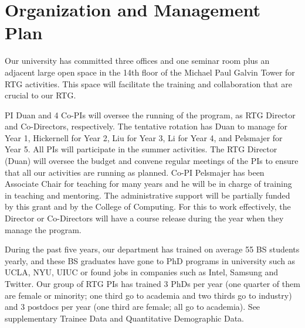 \documentclass[11pt]{NSFamsart}
\begin{document}
\section{Organization and Management Plan }
 
 \iffalse
 Provide evidence of past success in training undergraduates, graduate students, and postdocs, identifying names, degree dates, and subsequent placement (including the flow of undergraduates into graduate programs). Applicants may refer to Trainee Data in supplemental documents, if included. Describe the plans, procedures, and personnel for the development and monitoring of all aspects of the project. In particular, discuss plans to ensure appropriate mentoring of students and postdoctoral associates, as well as the roles of the faculty involved. Provide evidence of faculty commitment necessary for the implementation of the proposed program. If the project involves international collaborations, industrial internships, or arrangements with government laboratories, businesses, or other departments, then the proposal should document existing arrangements, any plans for expanding these arrangements, and the personnel involved in managing these linkages.  
 \fi
 
Our university has committed three offices and one seminar room plus an adjacent large open space in the 14th floor of the Michael Paul Galvin Tower for RTG activities. This space will facilitate the training and collaboration that are crucial to our RTG.
 
PI Duan and 4 Co-PIs will oversee the running of the program, as RTG Director  and Co-Directors, respectively.  The tentative rotation has Duan to manage for Year 1, Hickernell for Year 2,    Liu for  Year 3, Li for Year 4,     and Pelsmajer for Year 5.   All PIs will participate in the summer activities.  
The RTG Director (Duan) will oversee the budget and convene regular meetings of the PIs to ensure that all our activities are running as planned. Co-PI Pelsmajer has been
Associate Chair for teaching for many years and he will be in charge of  training in teaching and mentoring. 
The administrative support will be partially funded by this grant and by the College of Computing. 
For this to work effectively, the Director or Co-Directors will have a course release during the year when they manage the program.

During the past five years, our department has trained on average 55 BS students yearly, and these BS graduates have gone to PhD programs in university such as UCLA, NYU, UIUC or found jobs in companies such as Intel, Samsung and Twitter. Our group of RTG PIs has trained 3 PhDs per year (one quarter of them are female or minority; one third go to academia and two thirds go to industry)  and 3 postdocs per year (one third are female; all go to academia).  See supplementary Trainee Data and Quantitative Demographic Data. 
\end{document}
